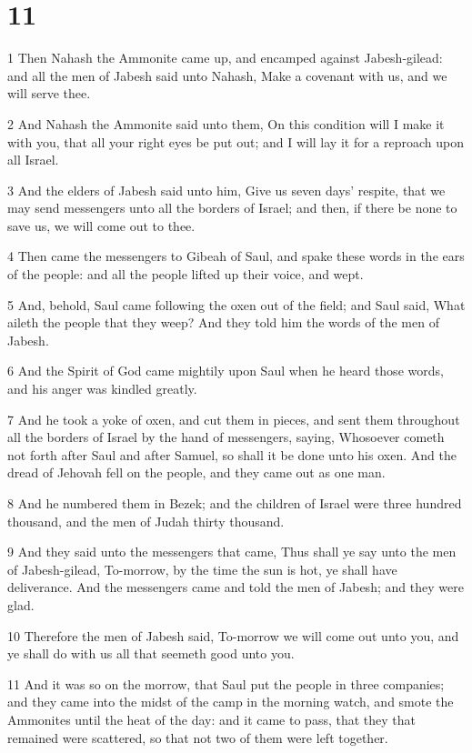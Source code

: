 \chapter{11}

\par 1 Then Nahash the Ammonite came up, and encamped against Jabesh-gilead: and all the men of Jabesh said unto Nahash, Make a covenant with us, and we will serve thee.
\par 2 And Nahash the Ammonite said unto them, On this condition will I make it with you, that all your right eyes be put out; and I will lay it for a reproach upon all Israel.
\par 3 And the elders of Jabesh said unto him, Give us seven days' respite, that we may send messengers unto all the borders of Israel; and then, if there be none to save us, we will come out to thee.
\par 4 Then came the messengers to Gibeah of Saul, and spake these words in the ears of the people: and all the people lifted up their voice, and wept.
\par 5 And, behold, Saul came following the oxen out of the field; and Saul said, What aileth the people that they weep? And they told him the words of the men of Jabesh.
\par 6 And the Spirit of God came mightily upon Saul when he heard those words, and his anger was kindled greatly.
\par 7 And he took a yoke of oxen, and cut them in pieces, and sent them throughout all the borders of Israel by the hand of messengers, saying, Whosoever cometh not forth after Saul and after Samuel, so shall it be done unto his oxen. And the dread of Jehovah fell on the people, and they came out as one man.
\par 8 And he numbered them in Bezek; and the children of Israel were three hundred thousand, and the men of Judah thirty thousand.
\par 9 And they said unto the messengers that came, Thus shall ye say unto the men of Jabesh-gilead, To-morrow, by the time the sun is hot, ye shall have deliverance. And the messengers came and told the men of Jabesh; and they were glad.
\par 10 Therefore the men of Jabesh said, To-morrow we will come out unto you, and ye shall do with us all that seemeth good unto you.
\par 11 And it was so on the morrow, that Saul put the people in three companies; and they came into the midst of the camp in the morning watch, and smote the Ammonites until the heat of the day: and it came to pass, that they that remained were scattered, so that not two of them were left together.
